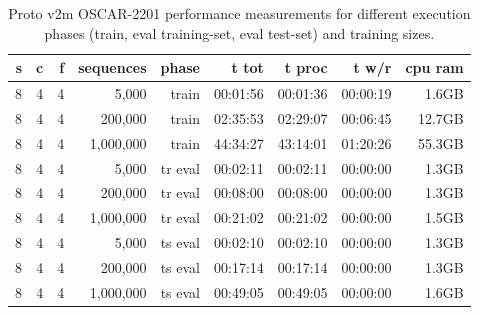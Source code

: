 \begin{table}[H]
\centering
\caption{Proto v2m OSCAR-2201 performance measurements for different execution phases (train, eval training-set, eval test-set) and training sizes.}
\label{tab:protov2m-oscar-performance-inferenceLeakyIntegrateAndFire}
\begin{tabular}{rrrrrrrrr}
\toprule
\textbf{s} & \textbf{c} & \textbf{f} & \textbf{sequences} & \textbf{phase} & \textbf{t tot} & \textbf{t proc} & \textbf{t w/r} & \textbf{cpu ram} \\
\midrule
8 & 4 & 4 & 5,000       & train   & 00:01:56 & 00:01:36 & 00:00:19 & 1.6GB \\
8 & 4 & 4 & 200,000     & train   & 02:35:53 & 02:29:07 & 00:06:45 & 12.7GB \\
8 & 4 & 4 & 1,000,000   & train   & 44:34:27 & 43:14:01 & 01:20:26 & 55.3GB \\
8 & 4 & 4 & 5,000       & tr eval & 00:02:11 & 00:02:11 & 00:00:00 & 1.3GB \\
8 & 4 & 4 & 200,000     & tr eval & 00:08:00 & 00:08:00 & 00:00:00 & 1.3GB \\
8 & 4 & 4 & 1,000,000   & tr eval & 00:21:02 & 00:21:02 & 00:00:00 & 1.5GB \\
8 & 4 & 4 & 5,000       & ts eval & 00:02:10 & 00:02:10 & 00:00:00 & 1.3GB \\
8 & 4 & 4 & 200,000     & ts eval & 00:17:14 & 00:17:14 & 00:00:00 & 1.3GB \\
8 & 4 & 4 & 1,000,000   & ts eval & 00:49:05 & 00:49:05 & 00:00:00 & 1.6GB \\
\bottomrule
\end{tabular}
\end{table}

